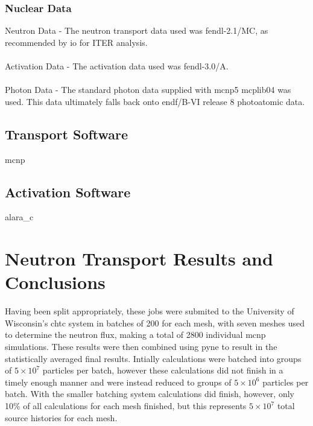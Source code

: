 \documentclass[12pt]{article}
\begin{document}
\subsubsection*{Nuclear Data}
Neutron Data - The neutron transport data used was \gls{fendl}-2.1/MC, as 
recommended by \gls{io} for ITER analysis. 
\\
\\
Activation Data - The activation data used was \gls{fendl}-3.0/A.
\\
\\
Photon Data - The standard photon data supplied with \gls{mcnp}5 mcplib04 was 
used. This data ultimately falls back onto \gls{endf}/B-VI release 8 photoatomic
data.
\subsection{Transport Software}
\gls{mcnp}
\subsection{Activation Software}
\gls{alara_c}
\newpage
\clearpage
\section{Neutron Transport Results and Conclusions}
Having been split appropriately, these jobs were submited to the University of
Wisconsin's \gls{chtc} system in batches of 200
for each mesh, with seven meshes used to determine the neutron flux, making a
total of 2800 individual \gls{mcnp} simulations. These results were then
combined using \gls{pyne} to result in the statistically averaged final results.
Intially calculations were batched into groups of $5\times10^7$ particles per
batch, however these calculations did not finish in a timely enough manner and
were instead reduced to groups of $5\times10^6$ particles per batch. With the
smaller batching system calculations did finish, however, only 10\% of all
calculations for each mesh finished, but this represents $5\times10^7$ total
source histories for each mesh. 
\end{document}
